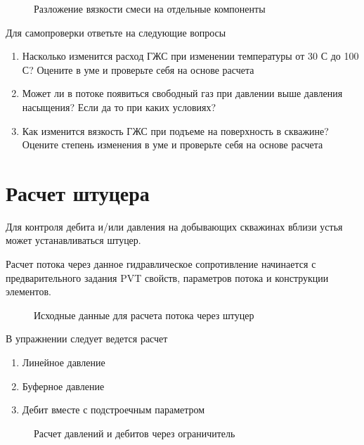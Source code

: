 \begin{figure}[h!]
	\center{\texttt{[image: Ex30\_4]}}
	\caption{Разложение вязкости смеси на отдельные компоненты}
	\label{ris:Ex30_4}
\end{figure}

Для самопроверки ответьте на следующие вопросы

\begin{enumerate}
	\item Насколько изменится расход ГЖС при изменении температуры от 30 С до 100 С? Оцените в уме и проверьте себя на основе расчета
	\item Может ли в потоке появиться свободный газ при давлении выше давления насыщения? Если да то при каких условиях?
	\item Как изменится вязкость ГЖС при подъеме на поверхность в скважине? Оцените степень изменения в уме и проверьте себя на основе расчета
\end{enumerate}


\section{Расчет штуцера}

Для контроля дебита и/или давления на добывающих скважинах вблизи устья может устанавливаться штуцер.

Расчет потока через данное гидравлическое сопротивление начинается с предварительного задания PVT свойств, параметров потока и конструкции элементов.

\begin{figure}[h!]
	\center{\texttt{[image: Ex40\_1]}}
	\caption{Исходные данные для расчета потока через штуцер}
	\label{ris:Ex40_1}
\end{figure}

В упражнении следует ведется расчет

\begin{enumerate}
	\item Линейное давление
	\item Буферное давление
	\item Дебит вместе с подстроечным параметром
\end{enumerate}

\begin{figure}[h!]
	\center{\texttt{[image: Ex40\_2]}}
	\caption{Расчет давлений и дебитов через ограничитель}
	\label{ris:Ex40_2}
\end{figure}

